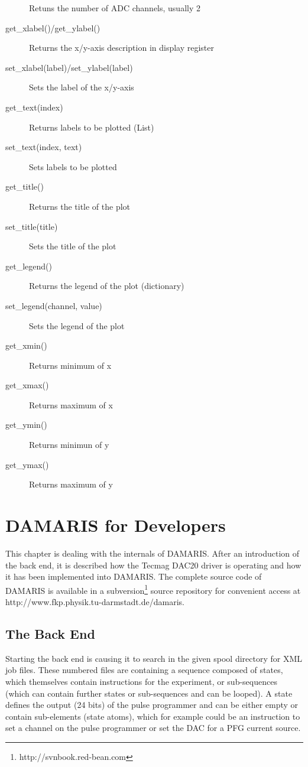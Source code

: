 \documentclass[12pt, a4paper, BCOR10mm, twoside, titlepage, headinclude]{scrbook}
\begin{document}
\begin{description}
Retuns the number of ADC channels, usually 2
\item[get\_xlabel()/get\_ylabel()]
Returns the x/y-axis description in display register
\item[set\_xlabel(label)/set\_ylabel(label)]
Sets the label of the x/y-axis
\item[get\_text(index)]
Returns labels to be plotted (List)
\item[set\_text(index, text)]
Sets labels to be plotted
\item[get\_title()]
Returns the title of the plot
\item[set\_title(title)]
Sets the title of the plot
\item[get\_legend()]
Returns the legend of the plot (dictionary)
\item[set\_legend(channel, value)]
Sets the legend of the plot
\item[get\_xmin()]
Returns minimum of x
\item[get\_xmax()]
Returns maximum of x
\item[get\_ymin()]
Returns minimun of y
\item[get\_ymax()]
Returns maximum of y
\end{description}


\newpage
\chapter{\textsf{DAMARIS} for Developers}
\label{damarisdev}
This chapter is dealing with the internals of \textsf{DAMARIS}. After an introduction of the back end, it is described how the Tecmag DAC20 driver is operating and how it has been implemented into \textsf{DAMARIS}. The complete source code of \textsf{DAMARIS} is available in a subversion\footnote{http://svnbook.red-bean.com} source repository for convenient access at \newline http://www.fkp.physik.tu-darmstadt.de/damaris.
\section{The Back End}
Starting the back end is causing it to search in the given spool directory for \textsf{XML} job files. These numbered files are containing a sequence composed of states, which themselves contain instructions for the experiment, or sub-sequences (which can contain further states or sub-sequences and can be looped).
A state defines the output (24 bits) of the pulse programmer and can be either empty or contain sub-elements (state atoms), which for example could be an instruction to set a channel on the pulse programmer or set the DAC for a PFG current source.
\end{document}
